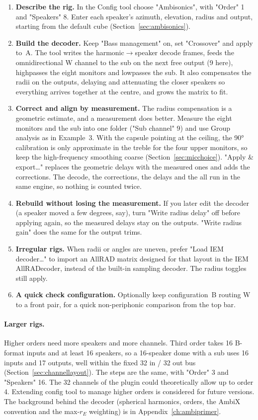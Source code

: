 \begin{enumerate}[nosep]
  \item \textbf{Describe the rig.} In the Config tool choose "Ambisonics", with "Order" 1 and "Speakers" 8. Enter each speaker's azimuth, elevation, radius and output, starting from the default cube (Section~\ref{sec:ambisonics}).
  \item \textbf{Build the decoder.} Keep "Bass management" on, set "Crossover" and apply to~A. The tool writes the harmonic$\rightarrow$speaker decode frames, feeds the omnidirectional W channel to the sub on the next free output (9 here), highpasses the eight monitors and lowpasses the sub. It also compensates the radii on the outputs, delaying and attenuating the closer speakers so everything arrives together at the centre, and grows the matrix to fit.
  \item \textbf{Correct and align by measurement.} The radius compensation is a geometric estimate, and a measurement does better. Measure the eight monitors and the sub into one folder ("Sub channel" 9) and use Group analysis as in Example~3. With the capsule pointing at the ceiling, the \ang{90} calibration is only approximate in the treble for the four upper monitors, so keep the high-frequency smoothing coarse (Section~\ref{sec:micchoice}). "Apply \& export\ldots" replaces the geometric delays with the measured ones and adds the corrections. The decode, the corrections, the delays and the  all run in the same engine, so nothing is counted twice.
  \item \textbf{Rebuild without losing the measurement.} If you later edit the decoder (a speaker moved a few degrees, say), turn "Write radius delay" off before applying again, so the measured delays stay on the outputs. "Write radius gain" does the same for the output trims.
  \item \textbf{Irregular rigs.} When radii or angles are uneven, prefer "Load IEM decoder\ldots" to import an AllRAD matrix designed for that layout in the IEM AllRADecoder, instead of the built-in sampling decoder. The radius toggles still apply.
  \item \textbf{A quick check configuration.} Optionally keep configuration~B routing W to a front pair, for a quick non-periphonic comparison from the top bar.
\end{enumerate}

\paragraph{Larger rigs.} Higher orders need more speakers and more channels. Third order takes 16 B-format inputs and at least 16 speakers, so a 16-speaker dome with a sub uses 16 inputs and 17 outputs, well within the fixed 32 in / 32 out bus (Section~\ref{sec:channellayout}). The steps are the same, with "Order" 3 and "Speakers" 16. The 32 channels of the plugin could theoretically allow up to order 4. Extending config tool to manage higher orders is considered for future versions. The background behind the decoder (spherical harmonics, orders, the AmbiX convention and the max-\(r_E\) weighting) is in Appendix~\ref{ch:ambiprimer}.
